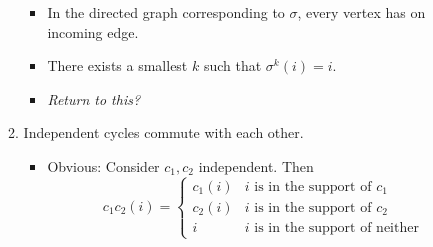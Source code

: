 \documentclass[../apprentice.tex]{subfiles}
\begin{document}
\begin{itemize}
\begin{enumerate}
\begin{itemize}
            \item In the directed graph corresponding to $\sigma$, every vertex has on incoming edge.
            \item There exists a smallest $k$ such that $\sigma^k(i)=i$.
            \item \emph{Return to this?}
        \end{itemize}
        \item Independent cycles commute with each other.
        \begin{itemize}
            \item Obvious: Consider $c_1,c_2$ independent. Then
            \begin{equation*}
                c_1c_2(i) =
                \begin{cases}
                    c_1(i) & i\text{ is in the support of }c_1\\
                    c_2(i) & i\text{ is in the support of }c_2\\
                    i      & i\text{ is in the support of neither}
                \end{cases}
            \end{equation*}
        \end{itemize}
    \end{enumerate}
\end{itemize}
\end{document}
